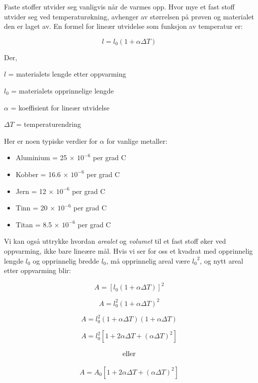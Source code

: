 
Faste stoffer utvider seg vanligvis når de varmes opp. Hvor mye et fast stoff utvider seg ved temperaturøkning, avhenger av størrelsen på prøven og materialet den er laget av. En formel for lineær utvidelse som funksjon av temperatur er:

$$l = l_0 (1 + \alpha \Delta T)$$

\noindent
Der,

$l$ = materialets lengde etter oppvarming

$l_0$ = materialets opprinnelige lengde

$\alpha$ = koeffisient for lineær utvidelse

$\Delta T$ = temperaturendring

\vskip 10pt

Her er noen typiske verdier for $\alpha$ for vanlige metaller:

\begin{itemize}
\item{} Aluminium = 25 $\times$ $10^{-6}$ per grad C
\item{} Kobber = 16.6 $\times$ $10^{-6}$ per grad C
\item{} Jern = 12 $\times$ $10^{-6}$ per grad C
\item{} Tinn = 20 $\times$ $10^{-6}$ per grad C
\item{} Titan = 8.5 $\times$ $10^{-6}$ per grad C
\end{itemize}

Vi kan også uttrykke hvordan \textit{arealet} og \textit{volumet} til et fast stoff øker ved oppvarming, ikke bare lineære mål. Hvis vi ser for oss et kvadrat med opprinnelig lengde $l_0$ og opprinnelig bredde $l_0$, må opprinnelig areal være ${l_0}^2$, og nytt areal etter oppvarming blir:

$$A = [l_0 (1 + \alpha \Delta T)]^2$$

$$A = l_0^2 (1 + \alpha \Delta T)^2$$

$$A = l_0^2 (1 + \alpha \Delta T)(1 + \alpha \Delta T)$$

$$A = l_0^2 [1 + 2 \alpha \Delta T + (\alpha \Delta T)^2]$$

$$\hbox{eller}$$

$$A = A_0 [1 + 2 \alpha \Delta T + (\alpha \Delta T)^2]$$

\vskip 10pt

